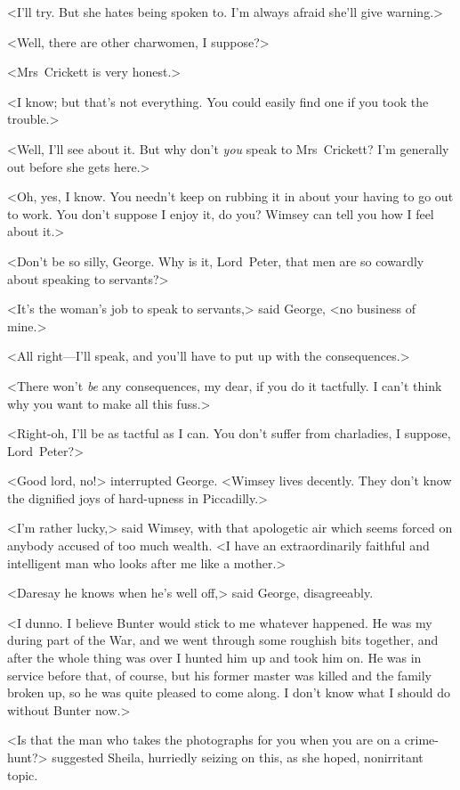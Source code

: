 <I'll try. But she hates being spoken to. I'm always afraid she'll give warning.>

<Well, there are other charwomen, I suppose?>

<Mrs~Crickett is very honest.>

<I know; but that's not everything. You could easily find one if you took the trouble.>

<Well, I'll see about it. But why don't \emph{you} speak to Mrs~Crickett? I'm generally out before she gets here.>

<Oh, yes, I know. You needn't keep on rubbing it in about your having to go out to work. You don't suppose I enjoy it, do you? Wimsey can tell you how I feel about it.>

<Don't be so silly, George. Why is it, Lord~Peter, that men are so cowardly about speaking to servants?>

<It's the woman's job to speak to servants,> said George, <no business of mine.>

<All right—I'll speak, and you'll have to put up with the consequences.>

<There won't \emph{be} any consequences, my dear, if you do it tactfully. I can't think why you want to make all this fuss.>

<Right-oh, I'll be as tactful as I can. You don't suffer from charladies, I suppose, Lord~Peter?>

<Good lord, no!> interrupted George. <Wimsey lives decently. They don't know the dignified joys of hard-upness in Piccadilly.>

<I'm rather lucky,> said Wimsey, with that apologetic air which seems forced on anybody accused of too much wealth. <I have an extraordinarily faithful and intelligent man who looks after me like a mother.>

<Daresay he knows when he's well off,> said George, disagreeably.

<I dunno. I believe Bunter would stick to me whatever happened. He was my  during part of the War, and we went through some roughish bits together, and after the whole thing was over I hunted him up and took him on. He was in service before that, of course, but his former master was killed and the family broken up, so he was quite pleased to come along. I don't know what I should do without Bunter now.>

<Is that the man who takes the photographs for you when you are on a crime-hunt?> suggested Sheila, hurriedly seizing on this, as she hoped, nonirritant topic.

